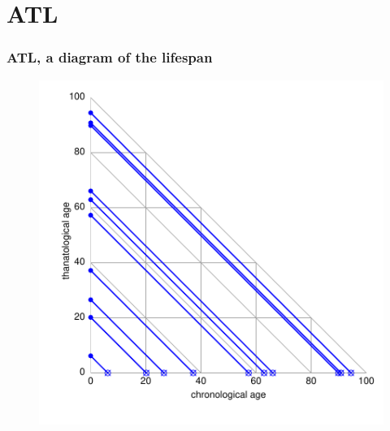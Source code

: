 \documentclass[20pt]{beamer}
\begin{document}
\section{ATL}
\begin{frame}
\frametitle{ATL, a diagram of the lifespan}
\begin{figure}[b]
    \centering
    \includegraphics{Figures/LabPres/ATL2.pdf}
\end{figure} 
\end{frame}
\end{document}
